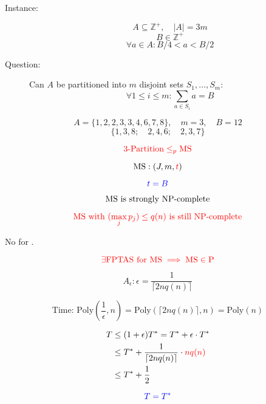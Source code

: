 \begin{frame}
  \begin{definition}[$3$-Partition]
	\begin{description}
	  \item[Instance:] 
		\[
		  A \subseteq \mathbb{Z}^{+},\quad \big|A\big| = 3m
		\]
		\[
		  B \in \mathbb{Z}^{+}
		\]
		\[
		  \forall a \in A: B/4 < a < B/2
		\]
	  \item[Question:] Can $A$ be partitioned into $m$ disjoint sets $S_1,\dots,S_m$:
		\[
		  \forall 1 \le i \le m: \sum_{a \in S_i} a = B
		\]
	\end{description}
  \end{definition}

  \pause
  \[
	A = \big\{1,2,2,3,3,4,6,7,8\big\},\quad m = 3,\quad B = 12 
  \]
  \[
	\Big\{1,3,8;\quad 2,4,6;\quad 2,3,7\Big\}
  \]
\end{frame}

\begin{frame}
  \[
	\textcolor{red}{3\text{-Partition} \le_{p} \text{MS}{}}
  \]

  \pause
  \[
	\text{MS}: (J, m, \textcolor{red}{t})
  \]

  \pause
  \[
	\textcolor{blue}{t = B}
  \]

  \pause
  \[
	\text{MS}{} \text{ is strongly } \text{NP-complete}{} 
  \]

  \pause
  \[
	\textcolor{red}{\text{MS}{} \text{ with } (\max_{j} p_j) \le q(n) \text{ is still } \text{NP-complete}{}}
  \]
\end{frame}

\begin{frame}
  \begin{theorem}[$\ms \in \ptas \setminus \fptas$]
	\centerline{No \fptas{} for \ms{}.}
  \end{theorem}

  \pause
  \[
	\textcolor{red}{\exists \text{FPTAS}{} \text{ for } \text{MS}{} \implies \text{MS} \in \text{P}{}}
  \]

  \pause
  \[
	A_{\epsilon}: \epsilon = \frac{1}{\lceil 2n q(n) \rceil}
  \]

  \pause
  \[
	\text{Time: } \text{Poly}(\frac{1}{\epsilon}, n) = \text{Poly}(\lceil 2n q(n) \rceil, n) = \text{Poly}(n)
  \]

  \pause
  \begin{align*}
	T &\le (1 + \epsilon) T^{\ast} = T^{\ast} + \epsilon \cdot T^{\ast} \\
	  &\le T^{\ast} + \frac{1}{\lceil 2n q(n) \rceil} \cdot \textcolor{red}{n q(n)} \\
	  &\le T^{\ast} + \frac{1}{2}
  \end{align*}

  \pause
  \vspace{-0.30cm}
  \[
	\textcolor{blue}{T = T^{\ast}}
  \]
\end{frame}

